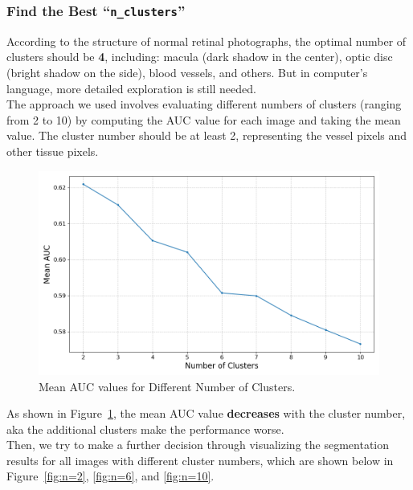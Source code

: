 \documentclass[12pt,letterpaper]{article}
\begin{document}
\subsubsection{Find the Best ``\texttt{n\_clusters}''}
According to the structure of normal retinal photographs, the optimal number of clusters should be \textbf{4}, including: macula (dark shadow in the center), optic disc (bright shadow on the side), blood vessels, and others. But in computer's language, more detailed exploration is still needed. \\
The approach we used involves evaluating different numbers of clusters (ranging from 2 to 10) by computing the AUC value for each image and taking the mean value. The cluster number should be at least 2, representing the vessel pixels and other tissue pixels. 
\begin{figure}[H]
    \centering
    \includegraphics[scale=0.5]{Figures/1-1 Find the Best n_clusters.png}
    \caption{Mean AUC values for Different Number of Clusters.}
    \label{fig:nclusters}
\end{figure}
\noindent
As shown in Figure~\ref{fig:nclusters}, the mean AUC value \textbf{decreases} with the cluster number, aka the additional clusters make the performance worse. \\
Then, we try to make a further decision through visualizing the segmentation results for all images with different cluster numbers, which are shown below in Figure~\ref{fig:n=2}, \ref{fig:n=6}, and \ref{fig:n=10}. 
\end{document}

